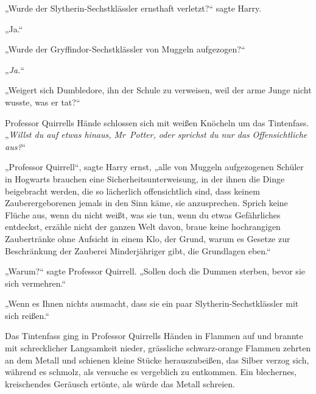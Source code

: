 „Wurde der Slytherin-Sechstklässler ernsthaft verletzt?“ sagte Harry.

„Ja.“

„Wurde der Gryffindor-Sechstklässler von Muggeln aufgezogen?“

„\emph{Ja.}“

„Weigert sich Dumbledore, ihn der Schule zu verweisen, weil der arme Junge nicht wusste, was er tat?“

Professor Quirrells Hände schlossen sich mit weißen Knöcheln um das Tintenfass.
„\emph{Willst du auf etwas hinaus, Mr~Potter, oder sprichst du nur das} \emph{Offensichtliche aus?}“

„Professor Quirrell“, sagte Harry ernst, „alle von Muggeln aufgezogenen Schüler in Hogwarts brauchen eine Sicherheitsunterweisung, in der ihnen die Dinge beigebracht werden, die so lächerlich offensichtlich sind, dass keinem Zauberergeborenen jemals in den Sinn käme, sie anzusprechen. Sprich keine Flüche aus, wenn du nicht weißt, was sie tun, wenn du etwas Gefährliches entdeckst, erzähle nicht der ganzen Welt davon, braue keine hochrangigen Zaubertränke ohne Aufsicht in einem Klo, der Grund, warum es Gesetze zur Beschränkung der Zauberei Minderjähriger gibt, die Grundlagen eben.“

„Warum?“ sagte Professor Quirrell.
„Sollen doch die Dummen sterben, bevor sie sich vermehren.“

„Wenn es Ihnen nichts ausmacht, dass sie ein paar Slytherin-Sechstklässler mit sich reißen.“

Das Tintenfass ging in Professor Quirrells Händen in Flammen auf und brannte mit schrecklicher Langsamkeit nieder, grässliche schwarz-orange Flammen zehrten an dem Metall und schienen kleine Stücke herauszubeißen, das Silber verzog sich, während es schmolz, als versuche es vergeblich zu entkommen. Ein blechernes, kreischendes Geräusch ertönte, als würde das Metall schreien.

